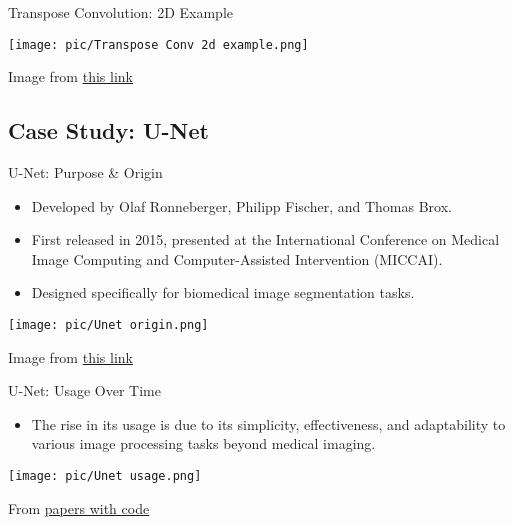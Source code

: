 \documentclass[serif, aspectratio=169]{beamer}
\begin{document}
\begin{frame}{Transpose Convolution: 2D Example}

    \begin{center}
        \texttt{[image: pic/Transpose Conv 2d example.png]} 
    \end{center}

    \vspace{0.6cm}
    \tiny{Image from \href{https://mriquestions.com/upsampling.html}{this link}}
\end{frame}


\subsection{Case Study: U-Net}


\begin{frame}{U-Net: Purpose \& Origin}
    \begin{itemize}
        \item Developed by Olaf Ronneberger, Philipp Fischer, and Thomas Brox.
        \item First released in 2015, presented at the International Conference on Medical Image Computing and Computer-Assisted Intervention (MICCAI).
        \item Designed specifically for biomedical \textcolor{deepblue}{image segmentation} tasks.
    \end{itemize}
    \begin{center}
        \texttt{[image: pic/Unet origin.png]} 
    \end{center}

    \vspace{0.3cm}
    \tiny{Image from \href{https://miro.medium.com/v2/resize:fit:1078/1*Dpmg8bywcabPdX08BtlleQ.png}{this link}}
\end{frame}


\begin{frame}{U-Net: Usage Over Time}
    \begin{itemize}
        \item The rise in its usage is due to its simplicity, effectiveness, and adaptability to various image processing tasks beyond medical imaging.
    \end{itemize}

    \begin{center}
        \texttt{[image: pic/Unet usage.png]} 
    \end{center}

    \vspace{1.4cm}
    \tiny{From \href{https://paperswithcode.com/method/u-net}{papers with code}}
\end{frame}
\end{document}

